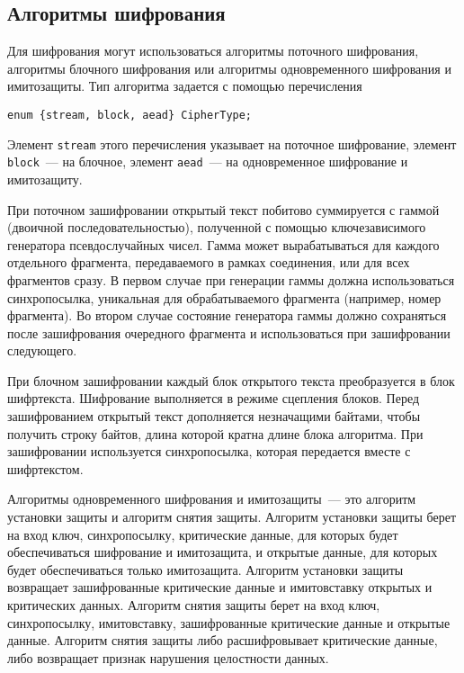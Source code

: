 \subsection{Алгоритмы шифрования}\label{CRYPTO.2.1}

Для шифрования могут использоваться алгоритмы поточного шифрования, алгоритмы 
блочного шифрования или алгоритмы одновременного шифрования и имитозащиты. 
Тип алгоритма задается с помощью перечисления
\begin{lstlisting}
enum {stream, block, aead} CipherType;
\end{lstlisting}

Элемент \lstinline{stream} этого перечисления указывает на поточное шифрование, 
элемент \lstinline|block|~--- на блочное, 
элемент \lstinline|aead|~--- на одновременное шифрование и имитозащиту.

При поточном зашифровании открытый текст побитово 
суммируется с гаммой (двоичной последовательностью), полученной с помощью 
ключезависимого генератора псевдослучайных чисел. Гамма может 
вырабатываться для каждого отдельного фрагмента, передаваемого в рамках 
соединения, или для всех фрагментов сразу. В первом случае при генерации 
гаммы должна использоваться синхропосылка, уникальная для обрабатываемого 
фрагмента (например, номер фрагмента). Во втором случае состояние 
генератора гаммы должно сохраняться после зашифрования очередного 
фрагмента и использоваться при зашифровании следующего. 

При блочном зашифровании каждый блок открытого текста 
преобразуется в блок шифртекста. Шифрование выполняется в режиме 
сцепления блоков. Перед зашифрованием открытый текст дополняется 
незначащими байтами, чтобы получить строку байтов, длина которой кратна 
длине блока алгоритма. При зашифровании используется синхропосылка, 
которая передается вместе с шифртекстом. 

Алгоритмы одновременного шифрования и имитозащиты~--- это алгоритм установки 
защиты и алгоритм снятия защиты. Алгоритм установки защиты берет на вход ключ, 
синхропосылку, критические данные, для которых будет обеспечиваться 
шифрование и имитозащита, и открытые данные, для которых будет 
обеспечиваться только имитозащита. Алгоритм установки защиты возвращает 
зашифрованные критические данные и имитовставку открытых и критических 
данных. Алгоритм снятия защиты берет на вход ключ, синхропосылку, 
имитовставку, зашифрованные критические данные и открытые данные. 
Алгоритм снятия защиты либо расшифровывает критические данные, либо 
возвращает признак нарушения целостности данных. 

